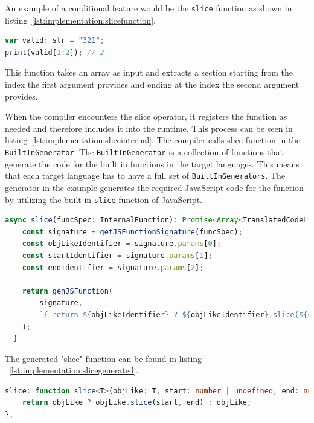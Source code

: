 An example of a conditional feature would be the \lstinline|slice| function as shown in listing~\ref{lst:implementation:slicefunction}. 

\begin{lstlisting}[language=TypeScript,caption=The Slice Operation,label=lst:implementation:slicefunction]
var valid: str = "321";
print(valid[1:2]); // 2
\end{lstlisting}

This function takes an array as input and extracts a section starting from the index the first argument provides and ending at the index the second argument provides.

When the compiler encounters the slice operator, it registers the function as needed and therefore includes it into the runtime. This process can be seen in listing~\ref{lst:implementation:sliceinternal}. The compiler calls slice function in the \lstinline|BuiltInGenerator|. The \lstinline|BuiltInGenerator| is a collection of functions that generate the code for the built in functions in the target languages. This means that each target language has to have a full set of \lstinline|BuiltInGenerators|. The generator in the example generates the required JavaScript code for the function by utilizing the built in \lstinline|slice| function of JavaScript.

\begin{lstlisting}[language=TypeScript,caption=Slice in the JavaScript BuiltInGenerator,label=lst:implementation:sliceinternal]
async slice(funcSpec: InternalFunction): Promise<Array<TranslatedCodeLine>> {
	const signature = getJSFunctionSignature(funcSpec);
	const objLikeIdentifier = signature.params[0];
	const startIdentifier = signature.params[1];
	const endIdentifier = signature.params[2];

	return genJSFunction(
		signature,
		`{ return ${objLikeIdentifier} ? ${objLikeIdentifier}.slice(${startIdentifier}, ${endIdentifier}) : ${objLikeIdentifier}; }`,
	);
  }
\end{lstlisting}

The generated "slice" function can be found in listing ~\ref{lst:implementation:slicegenerated}.

\begin{lstlisting}[language=TypeScript,caption=Slice in the target language,label=lst:implementation:slicegenerated]
slice: function slice<T>(objLike: T, start: number | undefined, end: number | undefined): T {
	return objLike ? objLike.slice(start, end) : objLike;
},
\end{lstlisting}

